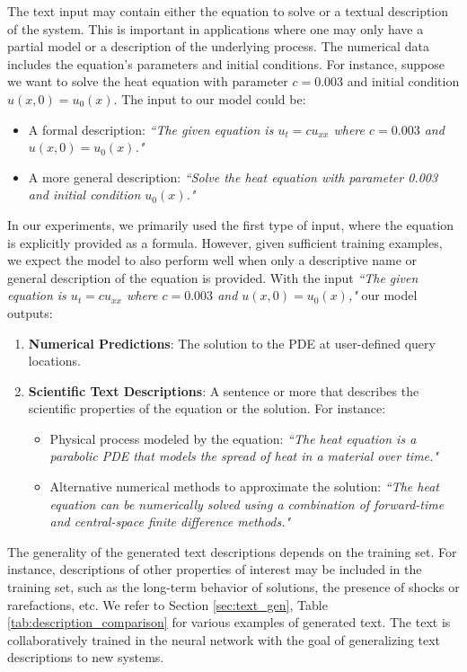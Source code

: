 \documentclass{article}
\begin{document}
The text input may contain either the equation to solve or a textual description of the system. This is important in applications where one may only have a partial model or a description of the underlying process. The numerical data includes the equation's parameters and initial conditions. For instance, suppose we want to solve the heat equation with parameter $c = 0.003$ and initial condition $u(x,0) = u_0(x)$. The input to our model could be:
\begin{itemize}
    \item A formal description: \emph{``The given equation is $u_t = c u_{xx}$ where $c = 0.003$ and $u(x,0) = u_0(x)$."}
    \item A more general description: \emph{``Solve the heat equation with parameter 0.003 and initial condition $u_0(x)$."}
\end{itemize}
In our experiments, we primarily used the first type of input, where the equation is explicitly provided as a formula. However, given sufficient training examples, we expect the model to also perform well when only a descriptive name or general description of the equation is provided.
With the input \emph{``The given equation is $u_t = c u_{xx}$ where $c = 0.003$ and $u(x,0) = u_0(x)$,"} our model outputs:
\begin{enumerate}
    \item \textbf{Numerical Predictions}: The solution to the PDE at user-defined query locations.
    \item \textbf{Scientific Text Descriptions}: A sentence or more that describes the scientific properties of the equation or the solution. For instance:
    \begin{itemize}
        \item Physical process modeled by the equation: \emph{``The heat equation is a parabolic PDE that models the spread of heat in a material over time."}
        \item Alternative numerical methods to approximate the solution: \emph{``The heat equation can be numerically solved using a combination of forward-time and central-space finite difference methods."}
    \end{itemize}
\end{enumerate}
The generality of the generated text descriptions depends on the training set. For instance, descriptions of other properties of interest may be included in the training set, such as the long-term behavior of solutions, the presence of shocks or rarefactions, etc. We refer to Section \ref{sec:text_gen}, Table \ref{tab:description_comparison} for various examples of generated text. The text is collaboratively trained in the neural network with the goal of generalizing text descriptions to new systems. 
\end{document}
